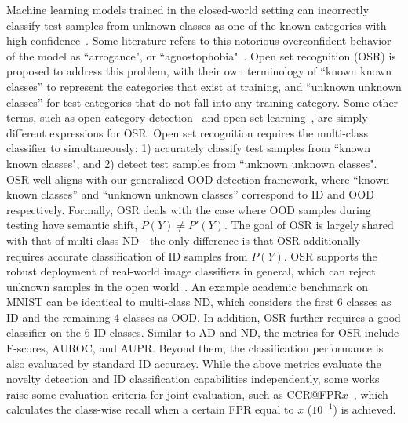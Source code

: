 \label{sec:tax_osr}
Machine learning models trained in the closed-world setting can incorrectly classify test samples from unknown classes as one of the known categories with high confidence~.
Some literature refers to this notorious overconfident behavior of the model as ``arrogance", or ``agnostophobia"~.
Open set recognition (OSR) is proposed to address this problem, with their own terminology of ``known known classes'' to represent the categories that exist at training, and ``unknown unknown classes'' for test categories that do not fall into any training category. Some other terms, such as open category detection~ and open set learning~, are simply different expressions for OSR.
\smallskip
{}
Open set recognition requires the multi-class classifier to simultaneously: 1) accurately classify test samples from ``known known classes", and 2) detect test samples from ``unknown unknown classes".
\smallskip
{}
OSR well aligns with our generalized OOD detection framework, where ``known known classes'' and ``unknown unknown classes'' correspond to ID and OOD respectively.
Formally, OSR deals with the case where OOD samples during testing have semantic shift, \ie $P(Y)\neq P'(Y)$.
The goal of OSR is largely shared with that of multi-class ND---the only difference is that OSR additionally requires accurate classification of ID samples from $P(Y)$.
\smallskip
{}
OSR supports the robust deployment of real-world image classifiers in general, which can reject unknown samples in the open world~.
An example academic benchmark on MNIST can be identical to multi-class ND, which considers the first 6 classes as ID and the remaining 4 classes as OOD. In addition, OSR further requires a good classifier on the 6 ID classes.
\smallskip
{}
Similar to AD and ND, the metrics for OSR include F-scores, AUROC, and AUPR. Beyond them, the classification performance is also evaluated by standard ID accuracy. While the above metrics evaluate the novelty detection and ID classification capabilities independently, some works raise some evaluation criteria for joint evaluation, such as CCR@FPR$x$~, which calculates the class-wise recall when a certain FPR equal to $x$ (\eg $10^{-1}$) is achieved.

